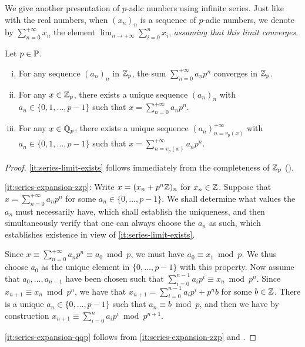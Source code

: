 \documentclass[12pt, leqno, british]{amsart}
\begin{document}
We give another presentation of $p$-adic numbers using infinite series.
Just like with the real numbers, when $(x_n)_n$ is a sequence of $p$-adic numbers, we denote by $\sum_{n=0}^{+\infty} x_n$ the element $\lim_{n \to +\infty} \sum_{i=0}^n x_i$, \textit{assuming that this limit converges}.
\begin{prop}\label{P:series-expansion}
Let $p \in \mathbb P$.
\begin{enumerate}[(i)]
\item\label{it:series-limit-exists} For any sequence $(a_n)_{n}$ in $\mathbb Z_p$, the sum $\sum_{n=0}^{+\infty} a_np^n$ converges in $\mathbb Z_p$.
\item\label{it:series-expansion-zzp} For any $x \in \mathbb Z_p$, there exists a unique sequence $(a_n)_n$ with $a_n \in \lbrace 0, 1, \ldots, p-1 \rbrace$ such that $x = \sum_{n=0}^{+\infty} a_np^n$.
\item\label{it:series-expansion-qqp} For any $x \in \mathbb Q_p$, there exists a unique sequence $(a_n)_{n=v_p(x)}^{+\infty}$ with $a_n \in \lbrace 0, 1, \ldots, p-1 \rbrace$ such that $x = \sum_{n = v_p(x)}^{+\infty}a_np^n$.
\end{enumerate}
\end{prop}
\begin{proof}
\eqref{it:series-limit-exists} follows immediately from the completeness of $\mathbb Z_p$ ().

\eqref{it:series-expansion-zzp}: Write $x = (x_n + p^n\mathbb Z)_n$ for $x_n \in \mathbb Z$.
Suppose that $x = \sum_{n=0}^{+\infty} a_np^n$ for some $a_n \in \lbrace 0, \ldots, p-1\rbrace$.
We shall determine what values the $a_n$ must necessarily have, which shall establish the uniqueness, and then simultaneously verify that one can always choose the $a_n$ as such, which establishes existence in view of \eqref{it:series-limit-exists}.

Since $x \equiv \sum_{n=0}^{+\infty} a_np^n \equiv a_0 \bmod p$, we must have $a_0 \equiv x_1 \bmod p$.
We thus choose $a_0$ as the unique element in $\lbrace 0, \ldots, p - 1 \rbrace$ with this property.
Now assume that $a_0, \ldots, a_{n-1}$ have been chosen such that $\sum_{i=0}^{n-1} a_ip^i \equiv x_n \bmod p^n$.
Since $x_{n+1} \equiv x_n \bmod p^n$, we have that $x_{n+1} = \sum_{i=0}^{n-1}a_ip^i + p^nb$ for some $b \in \mathbb Z$.
There is a unique $a_n \in \lbrace 0, \ldots, p-1\rbrace$ such that $a_n \equiv b \bmod p$, and then we have by construction $x_{n+1} \equiv \sum_{i=0}^n a_ip^i \bmod p^{n+1}$.

\eqref{it:series-expansion-qqp} follows from \eqref{it:series-expansion-zzp} and .
\end{proof}
\end{document}
